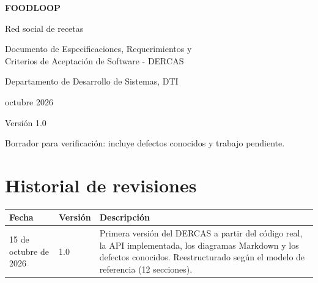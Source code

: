 \documentclass[12pt,a4paper]{report}
\newcommand{\dercasversion}{1.0}
\newcommand{\dercasestado}{Borrador para verificación: incluye defectos conocidos y trabajo pendiente.}
\begin{document}
\begin{titlepage}
  \centering
  \vspace*{2.5cm}
  {\Huge\bfseries FOODLOOP\par}
  \vspace{0.4cm}
  {\Large Red social de recetas\par}
  \vspace{1.8cm}
  {\large Documento de Especificaciones, Requerimientos y\\
  Criterios de Aceptación de Software - DERCAS\par}
  \vspace{1.8cm}
  {\large Departamento de Desarrollo de Sistemas, DTI\par}
  \vspace{0.5cm}
  {\large octubre 2026\par}
  \vfill
  {\normalsize Versión \dercasversion\par}
  \vspace{0.4cm}
  {\small \dercasestado\par}
\end{titlepage}

\chapter*{Historial de revisiones}

\begin{center}
\begin{tabular}{p{3cm}p{2cm}p{8.5cm}}
  \toprule
  Fecha & Versión & Descripción \\
  \midrule
  15 de octubre de 2026 & 1.0 & Primera versión del DERCAS a partir del código real, la API implementada, los diagramas Markdown y los defectos conocidos. Reestructurado según el modelo de referencia (12 secciones). \\
  \bottomrule
\end{tabular}
\end{center}

\tableofcontents













\end{document}
